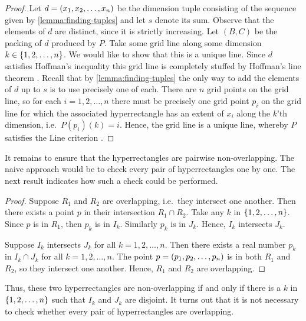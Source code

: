 \begin{proof}
Let $d = \left( x_1, x_2, \dotsc, x_n \right)$ be the dimension tuple consisting of the sequence given by \cref{lemma:finding-tuples} and let $s$ denote its sum. Observe that the elements of $d$ are distinct, since it is strictly increasing. Let $(B, C)$ be the packing of $d$ produced by $P$. Take some grid line along some dimension $k \in \left\{ 1, 2, \dotsc, n \right\}$. We would like to show that this is a unique line. Since $d$ satisfies Hoffman's inequality this grid line is completely stuffed by Hoffman's line theorem . Recall that by \cref{lemma:finding-tuples} the only way to add the elements of $d$ up to $s$ is to use precisely one of each. There are $n$ grid points on the grid line, so for each $i = 1, 2, \dotsc, n$ there must be precisely one grid point $p_i$ on the grid line for which the associated hyperrectangle has an extent of $x_i$ along the $k$'th dimension, i.e.\ $P(p_i)(k) = i$. Hence, the grid line is a unique line, whereby $P$ satisfies the Line criterion .
\end{proof}

\noindent It remains to ensure that the hyperrectangles are pairwise non-overlapping. The naive approach would be to check every pair of hyperrectangles one by one. The next result indicates how such a check could be performed.

\begin{proof}
Suppose $R_1$ and $R_2$ are overlapping, i.e.\ they intersect one another. Then there exists a point $p$ in their intersection $R_1 \cap R_2$. Take any $k$ in $\left\{ 1, 2, \dotsc, n \right\}$. Since $p$ is in $R_1$, then $p_k$ is in $I_k$. Similarly $p_k$ is in $J_k$. Hence, $I_k$ intersects $J_k$.

Suppose $I_k$ intersects $J_k$ for all $k = 1, 2, \dotsc, n$. Then there exists a real number $p_k$ in $I_k \cap J_k$ for all $k = 1, 2, \dotsc, n$. The point $p = \left( p_1, p_2, \dotsc, p_n \right)$ is in both $R_1$ and $R_2$, so they intersect one another. Hence, $R_1$ and $R_2$ are overlapping.
\end{proof}
\noindent Thus, these two hyperrectangles are non-overlapping if and only if there is a $k$ in $\left\{ 1, 2, \dotsc, n \right\}$ such that $I_k$ and $J_k$ are disjoint. It turns out that it is not necessary to check whether every pair of hyperrectangles are overlapping.

